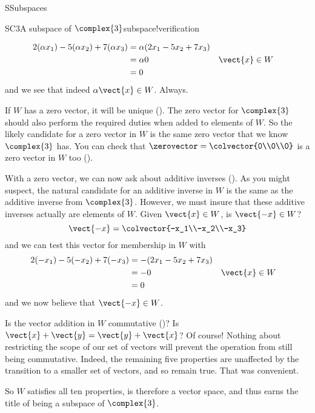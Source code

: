 \begin{subsect}{S}{Subspaces}
\begin{example}{SC3}{A subspace of $\complex{3}$}{subspace!verification}
\begin{para}
%
\begin{align*}
2(\alpha x_1)-5(\alpha x_2)+7(\alpha x_3)
&=\alpha(2x_1-5x_2+7x_3)\\
&=\alpha 0&&\vect{x}\in W\\
&=0
\end{align*}
%
and we see that indeed $\alpha\vect{x}\in W$.  Always.\end{para}
%
\begin{para}If $W$ has a zero vector, it will be unique ().  The zero vector for $\complex{3}$ should also perform the required duties when added to elements of $W$.  So the likely candidate for a zero vector in $W$ is the same zero vector that we know $\complex{3}$ has.  You can check that $\zerovector=\colvector{0\\0\\0}$ is a zero vector in $W$ too ().\end{para}
%
\begin{para}With a zero vector, we can now ask about additive inverses ().  As you might suspect, the natural candidate for an additive inverse in $W$ is the same as the additive inverse from $\complex{3}$.  However, we must insure that these additive inverses actually are elements of $W$.  Given $\vect{x}\in W$, is $\vect{-x}\in W$?
%
\begin{equation*}
\vect{-x}=\colvector{-x_1\\-x_2\\-x_3}
\end{equation*}
%
and we can test this vector for membership in $W$ with
%
\begin{align*}
2(-x_1)-5(-x_2)+7(-x_3)
&=-(2x_1-5x_2+7x_3)\\
&=-0&&\vect{x}\in W\\
&=0
\end{align*}
%
and we now believe that $\vect{-x}\in W$.\end{para}
%
\begin{para}Is the vector addition in $W$ commutative ()?  Is $\vect{x}+\vect{y}=\vect{y}+\vect{x}$?  Of course!  Nothing about restricting the scope of our set of vectors will prevent the operation from still being commutative.  Indeed, the remaining five properties are unaffected by the transition to a smaller set of vectors, and so remain true.  That was convenient.\end{para}
%
\begin{para}So $W$ satisfies all ten properties, is therefore a vector space, and thus earns the title of being a subspace of $\complex{3}$.\end{para}
%
\end{example}
%
\end{subsect}
